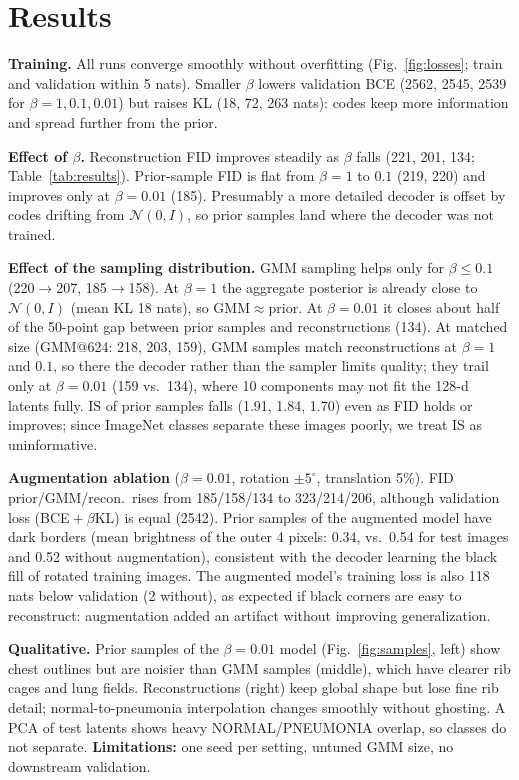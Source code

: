 \documentclass{article}
\begin{document}
\section{Results}
\textbf{Training.} All runs converge smoothly without overfitting (Fig.~\ref{fig:losses}; train and validation within 5 nats). Smaller $\beta$ lowers validation BCE (2562, 2545, 2539 for $\beta=1,0.1,0.01$) but raises KL (18, 72, 263 nats): codes keep more information and spread further from the prior.

\textbf{Effect of $\beta$.} Reconstruction FID improves steadily as $\beta$ falls (221, 201, 134; Table~\ref{tab:results}). Prior-sample FID is flat from $\beta{=}1$ to $0.1$ (219, 220) and improves only at $\beta{=}0.01$ (185). Presumably a more detailed decoder is offset by codes drifting from $\mathcal{N}(0,I)$, so prior samples land where the decoder was not trained.

\textbf{Effect of the sampling distribution.} GMM sampling helps only for $\beta\le0.1$ (220$\to$207, 185$\to$158). At $\beta{=}1$ the aggregate posterior is already close to $\mathcal{N}(0,I)$ (mean KL 18 nats), so GMM$\approx$prior. At $\beta{=}0.01$ it closes about half of the 50-point gap between prior samples and reconstructions (134). At matched size (GMM@624: 218, 203, 159), GMM samples match reconstructions at $\beta{=}1$ and $0.1$, so there the decoder rather than the sampler limits quality; they trail only at $\beta{=}0.01$ (159 vs.\ 134), where 10 components may not fit the 128-d latents fully. IS of prior samples falls (1.91, 1.84, 1.70) even as FID holds or improves; since ImageNet classes separate these images poorly, we treat IS as uninformative.

\textbf{Augmentation ablation} ($\beta{=}0.01$, rotation $\pm5^\circ$, translation 5\%). FID prior/GMM/recon.\ rises from 185/158/134 to 323/214/206, although validation loss (BCE${}+\beta$KL) is equal (2542). Prior samples of the augmented model have dark borders (mean brightness of the outer 4 pixels: 0.34, vs.\ 0.54 for test images and 0.52 without augmentation), consistent with the decoder learning the black fill of rotated training images. The augmented model's training loss is also 118 nats below validation (2 without), as expected if black corners are easy to reconstruct: augmentation added an artifact without improving generalization.

\textbf{Qualitative.} Prior samples of the $\beta{=}0.01$ model (Fig.~\ref{fig:samples}, left) show chest outlines but are noisier than GMM samples (middle), which have clearer rib cages and lung fields. Reconstructions (right) keep global shape but lose fine rib detail; normal-to-pneumonia interpolation changes smoothly without ghosting. A PCA of test latents shows heavy NORMAL/PNEUMONIA overlap, so classes do not separate. \textbf{Limitations:} one seed per setting, untuned GMM size, no downstream validation.


\clearpage
{\footnotesize
\setlength{\bibsep}{1pt}


}
\end{document}
